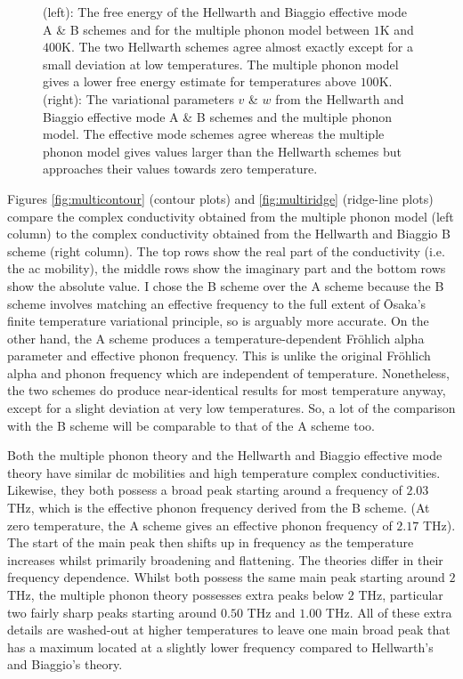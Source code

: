 \begin{figure}[t]
{\begin{subfigure}[b]{.6\textwidth}
\end{subfigure}%
}
\caption{(left): The free energy of the Hellwarth and Biaggio effective mode A \& B schemes and for the multiple phonon model between $1$K and $400$K. The two Hellwarth schemes agree almost exactly except for a small deviation at low temperatures. The multiple phonon model gives a lower free energy estimate for temperatures above $100$K. (right): The variational parameters $v$ \& $w$ from the Hellwarth and Biaggio effective mode A \& B schemes and the multiple phonon model. The effective mode schemes agree whereas the multiple phonon model gives values larger than the Hellwarth schemes but approaches their values towards zero temperature.}
\label{fig:multitheory}
\end{figure}

Figures \ref{fig:multicontour} (contour plots) and \ref{fig:multiridge} (ridge-line plots) compare the complex conductivity obtained from the multiple phonon model (left column) to the complex conductivity obtained from the Hellwarth and Biaggio B scheme (right column). The top rows show the real part of the conductivity (i.e. the ac mobility), the middle rows show the imaginary part and the bottom rows show the absolute value. I chose the B scheme over the A scheme because the B scheme involves matching an effective frequency to the full extent of \=Osaka's finite temperature variational principle, so is arguably more accurate. On the other hand, the A scheme produces a temperature-dependent Fr\"ohlich alpha parameter and effective phonon frequency. This is unlike the original Fr\"ohlich alpha and phonon frequency which are independent of temperature. Nonetheless, the two schemes do produce near-identical results for most temperature anyway, except for a slight deviation at very low temperatures. So, a lot of the comparison with the B scheme will be comparable to that of the A scheme too. 

Both the multiple phonon theory and the Hellwarth and Biaggio effective mode theory have similar dc mobilities and high temperature complex conductivities. Likewise, they both possess a broad peak starting around a frequency of $2.03$ THz, which is the effective phonon frequency derived from the B scheme. (At zero temperature, the A scheme gives an effective phonon frequency of $2.17$ THz). The start of the main peak then shifts up in frequency as the temperature increases whilst primarily broadening and flattening. The theories differ in their frequency dependence. Whilst both possess the same main peak starting around $2$ THz, the multiple phonon theory possesses extra peaks below $2$ THz, particular two fairly sharp peaks starting around $0.50$ THz and $1.00$ THz. All of these extra details are washed-out at higher temperatures to leave one main broad peak that has a maximum located at a slightly lower frequency compared to Hellwarth's and Biaggio's theory.

